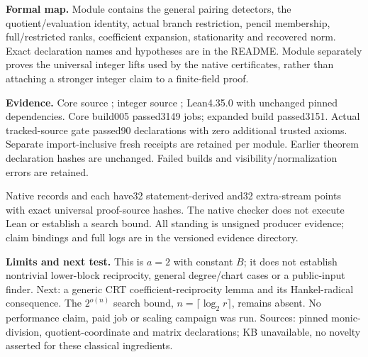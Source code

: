 \documentclass[11pt]{article}
\begin{document}
\textbf{Formal map.} Module  contains the general
pairing detectors, the quotient/evaluation identity, actual branch restriction,
pencil membership, full/restricted ranks, coefficient expansion, stationarity
and recovered norm. Exact declaration names and hypotheses are in the README.
Module  separately proves the universal integer lifts
used by the native certificates, rather than attaching a stronger integer
claim to a finite-field proof.

\textbf{Evidence.} Core source ; integer source
; Lean4.35.0 with unchanged pinned dependencies. Core build005
passed3149 jobs; expanded build passed3151. Actual tracked-source gate passed90
declarations with zero additional trusted axioms. Separate import-inclusive
fresh receipts are retained per module. Earlier theorem declaration hashes
are unchanged. Failed builds and visibility/normalization errors are retained.

Native records  and
 each have32 statement-derived and32 extra-stream
points with exact universal proof-source hashes. The native checker does not
execute Lean or establish a search bound. All standing is unsigned producer
evidence; claim bindings and full logs are in the versioned evidence directory.

\textbf{Limits and next test.} This is $a=2$ with constant $B$; it does not
establish nontrivial lower-block reciprocity, general degree/chart cases or a
public-input finder. Next: a generic CRT coefficient-reciprocity lemma and its
Hankel-radical consequence. The $2^{o(n)}$ search bound, $n=\lceil\log_2 r\rceil$,
remains absent. No performance claim, paid job or scaling campaign was run.
Sources: pinned monic-division, quotient-coordinate and matrix declarations;
KB unavailable, no novelty asserted for these classical ingredients.
\end{document}
